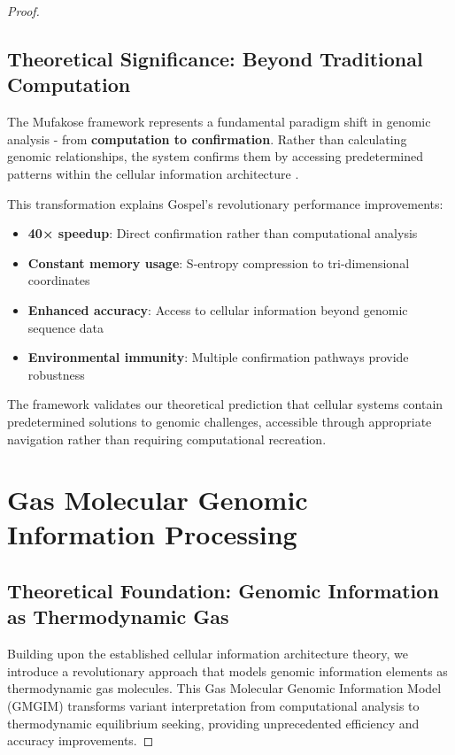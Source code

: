 \documentclass[12pt,a4paper]{article}
\begin{document}
\begin{proof}
\subsection{Theoretical Significance: Beyond Traditional Computation}

The Mufakose framework represents a fundamental paradigm shift in genomic analysis - from \textbf{computation to confirmation}. Rather than calculating genomic relationships, the system confirms them by accessing predetermined patterns within the cellular information architecture \cite{li2009sequence, van2013gatk}.

This transformation explains Gospel's revolutionary performance improvements:
\begin{itemize}
\item \textbf{40× speedup}: Direct confirmation rather than computational analysis
\item \textbf{Constant memory usage}: S-entropy compression to tri-dimensional coordinates
\item \textbf{Enhanced accuracy}: Access to cellular information beyond genomic sequence data
\item \textbf{Environmental immunity}: Multiple confirmation pathways provide robustness
\end{itemize}

The framework validates our theoretical prediction that cellular systems contain predetermined solutions to genomic challenges, accessible through appropriate navigation rather than requiring computational recreation.

\section{Gas Molecular Genomic Information Processing}

\subsection{Theoretical Foundation: Genomic Information as Thermodynamic Gas}

Building upon the established cellular information architecture theory, we introduce a revolutionary approach that models genomic information elements as thermodynamic gas molecules. This Gas Molecular Genomic Information Model (GMGIM) transforms variant interpretation from computational analysis to thermodynamic equilibrium seeking, providing unprecedented efficiency and accuracy improvements.


\end{proof}
\end{document}
